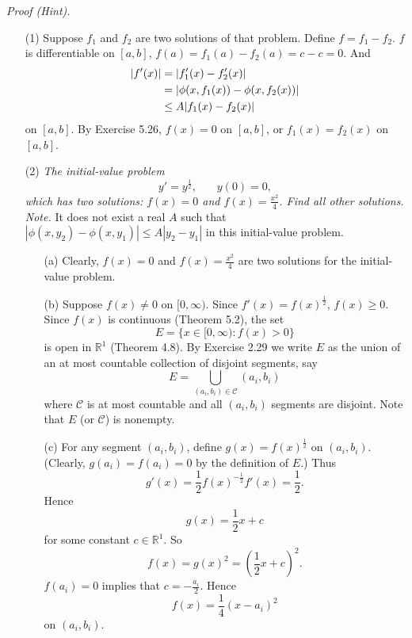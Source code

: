 \documentclass{article}
\begin{document}
\emph{Proof (Hint).}
\begin{enumerate}
\item[(1)]
Suppose $f_1$ and $f_2$ are two solutions of that problem.
Define $f = f_1 - f_2$.
$f$ is differentiable on $[a,b]$, $f(a) = f_1(a) - f_2(a) = c - c = 0$.
And
\begin{align*}
  |f'(x)|
  &= |f_1'(x) - f_2'(x)| \\
  &= \abs{ \phi(x,f_1(x)) - \phi(x,f_2(x)) } \\
  &\leq A | f_1(x) - f_2(x) |
\end{align*}
on $[a,b]$.
By Exercise 5.26, $f(x) = 0$ on $[a,b]$, or $f_1(x) = f_2(x)$ on $[a,b]$.

\item[(2)]
\emph{The initial-value problem
\[
  y' = y^{\frac{1}{2}}, \:\:\:\:\:\:\:\: y(0) = 0,
\]
which has two solutions: $f(x) = 0$ and $f(x) = \frac{x^2}{4}$.
Find all other solutions.} \\

  \emph{Note.}
  It does not exist a real $A$ such that $|\phi(x,y_2) - \phi(x,y_1)| \leq A|y_2 - y_1|$
  in this initial-value problem.

  \begin{enumerate}
  \item[(a)]
  Clearly, $f(x) = 0$ and $f(x) = \frac{x^2}{4}$ are two solutions for the initial-value problem.

  \item[(b)]
  Suppose $f(x) \neq 0$ on $[0,\infty)$.
  Since $f'(x) = f(x)^{\frac{1}{2}}$, $f(x) \geq 0$.
  Since $f(x)$ is continuous (Theorem 5.2), the set
  \[
    E = \{ x \in [0, \infty) : f(x) > 0 \}
  \]
  is open in $\mathbb{R}^1$ (Theorem 4.8).
  By Exercise 2.29
  we write $E$ as the union of an at most countable collection of disjoint segments,
  say
  \[
    E = \bigcup_{(a_i,b_i) \in \mathscr{C}} (a_i,b_i)
  \]
  where $\mathscr{C}$ is at most countable and all $(a_i,b_i)$ segments are disjoint.
  Note that $E$ (or $\mathscr{C}$) is nonempty.

  \item[(c)]
  For any segment $(a_i,b_i)$,
  define $g(x) = f(x)^{\frac{1}{2}}$ on $(a_i,b_i)$.
  (Clearly, $g(a_i) = f(a_i) = 0$ by the definition of $E$.)
  Thus
  \[
    g'(x) = \frac{1}{2} f(x)^{-\frac{1}{2}} f'(x) = \frac{1}{2}.
  \]
  Hence
  \[
    g(x) = \frac{1}{2} x + c
  \]
  for some constant $c \in \mathbb{R}^1$.
  So
  \[
    f(x) = g(x)^2 = \left( \frac{1}{2} x + c \right)^2.
  \]
  $f(a_i) = 0$ implies that $c = -\frac{a_i}{2}$.
  Hence
  \[
    f(x) = \frac{1}{4}(x - a_i)^2
  \]
  on $(a_i,b_i)$.


\end{enumerate}
\end{enumerate}
\end{document}
